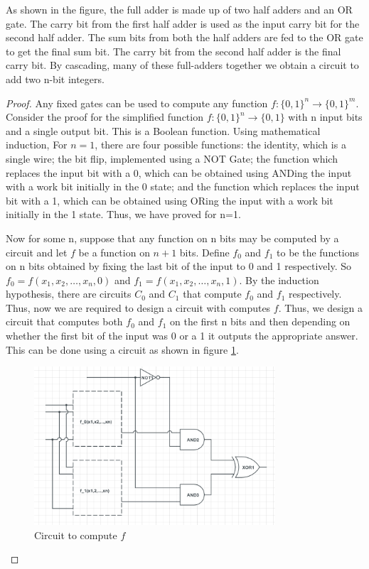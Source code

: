 \documentclass[12pt, oneside]{book}
\theoremstyle{definition}
\theoremstyle{definition}
\theoremstyle{remark}
\begin{document}
As shown in the figure, the full adder is made up of two half adders and an OR gate. The carry bit from the first half adder is used as the input carry bit for the second half adder. The sum bits from both the half adders are fed to the OR gate to get the final sum bit. The carry bit from the second half adder is the final carry bit.
By cascading, many of these full-adders together we obtain a circuit to add two n-bit integers.

\label{proof:classicalcomputations}
\begin{proof}
    Any fixed gates can be used to compute any function $f:\{0,1\}^n \rightarrow \{0,1\}^m$.
    Consider the proof for the simplified function $f:\{0,1\}^n \rightarrow \{0,1\}$ with n input bits
    and a single output bit. This is a Boolean function. Using mathematical induction, For $n=1$, there are four possible functions: the identity, which is 
    a single wire; the bit flip, implemented using a NOT Gate; the function which replaces the input bit with a 0, which can be obtained using ANDing the input 
    with a work bit initially in the 0 state; and the function which replaces the input bit with a 1, which can be obtained using ORing the input with a work bit initially in the 1 state.
    Thus, we have proved for n=1.
    
    Now for some n, suppose that any function on n bits may be computed by a circuit and let $f$ be a function on $n+1$ bits. 
    Define $f_0$ and $f_1$ to be the functions on n bits obtained by fixing the last bit of the input to 0 and 1 respectively.
    So $f_0=f(x_1,x_2,\ldots,x_n,0)$ and $f_1=f(x_1,x_2,\ldots,x_n,1)$.
    By the induction hypothesis, there are circuits $C_0$ and $C_1$ that compute $f_0$ and $f_1$ respectively.
    Thus, now we are required to design a circuit with computes $f$. Thus, we design a circuit that computes both $f_0$ and $f_1$ 
    on the first n bits and then depending on whether the first bit of the input was 0 or a 1 it outputs the appropriate answer.
    This can be done using a circuit as shown in figure \ref{fig:compute}.
    \begin{figure}[H]
        \centering
        \includegraphics[width=0.8\textwidth]{../images/compute.png}
        \caption{Circuit to compute $f$}
        \label{fig:compute}
    \end{figure}
\end{proof}
\end{document}
